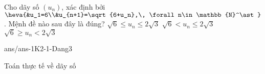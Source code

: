 \begin{ex}%
	Cho dãy số $(u_n)$, xác định bởi $\heva{&u_1=6\\&u_{n+1}=\sqrt{6+u_n},\, \forall n\in\mathbb{N}^\ast}$. Mệnh đề nào sau đây là đúng?
	{\True $\sqrt{6}\leq u_n\leq 2\sqrt{3}$}
	{$\sqrt{6}<u_n\leq 2\sqrt{3}$	}
	{$\sqrt{6}\geq u_n<2\sqrt{3}$	}
\end{ex}
\begin{indapan}{10}
	{ans/ans-1K2-1-Dang3}
\end{indapan}

\begin{dang}{Toán thực tế về dãy số}
\end{dang}
